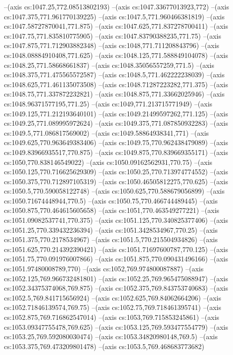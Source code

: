 --(axis cs:1047.25,772.08513802193)
--(axis cs:1047.33677013923,772)
--(axis cs:1047.375,771.961770139225)
--(axis cs:1047.5,771.960466381819)
--(axis cs:1047.58727870041,771.875)
--(axis cs:1047.625,771.837278700411)
--(axis cs:1047.75,771.835810775905)
--(axis cs:1047.83790388235,771.75)
--(axis cs:1047.875,771.712903882348)
--(axis cs:1048,771.711208843796)
--(axis cs:1048.08884910408,771.625)
--(axis cs:1048.125,771.588849104078)
--(axis cs:1048.25,771.58668661837)
--(axis cs:1048.35056557259,771.5)
--(axis cs:1048.375,771.475565572587)
--(axis cs:1048.5,771.462222238039)
--(axis cs:1048.625,771.461135073508)
--(axis cs:1048.71287223282,771.375)
--(axis cs:1048.75,771.337872232821)
--(axis cs:1048.875,771.33662025946)
--(axis cs:1048.96371577195,771.25)
--(axis cs:1049,771.213715771949)
--(axis cs:1049.125,771.212193640101)
--(axis cs:1049.21499597262,771.125)
--(axis cs:1049.25,771.089995972624)
--(axis cs:1049.375,771.087850932283)
--(axis cs:1049.5,771.086817569002)
--(axis cs:1049.58864938341,771)
--(axis cs:1049.625,770.963649383406)
--(axis cs:1049.75,770.962438479089)
--(axis cs:1049.83966935517,770.875)
--(axis cs:1049.875,770.839669355171)
--(axis cs:1050,770.838146549022)
--(axis cs:1050.09162562931,770.75)
--(axis cs:1050.125,770.716625629309)
--(axis cs:1050.25,770.713974774552)
--(axis cs:1050.375,770.712897105319)
--(axis cs:1050.46505812275,770.625)
--(axis cs:1050.5,770.590058122748)
--(axis cs:1050.625,770.588679056899)
--(axis cs:1050.71674448944,770.5)
--(axis cs:1050.75,770.466744489445)
--(axis cs:1050.875,770.464615605658)
--(axis cs:1051,770.463549277221)
--(axis cs:1051.09082537741,770.375)
--(axis cs:1051.125,770.340825377406)
--(axis cs:1051.25,770.339432236394)
--(axis cs:1051.3428534967,770.25)
--(axis cs:1051.375,770.2178534967)
--(axis cs:1051.5,770.215504934826)
--(axis cs:1051.625,770.214392390421)
--(axis cs:1051.71697600787,770.125)
--(axis cs:1051.75,770.091976007866)
--(axis cs:1051.875,770.090431496166)
--(axis cs:1051.97480008789,770)
--(axis cs:1052,769.974800087887)
--(axis cs:1052.125,769.966732481801)
--(axis cs:1052.25,769.965475088947)
--(axis cs:1052.34375374068,769.875)
--(axis cs:1052.375,769.843753740683)
--(axis cs:1052.5,769.841715656924)
--(axis cs:1052.625,769.84062664206)
--(axis cs:1052.71846139574,769.75)
--(axis cs:1052.75,769.718461395741)
--(axis cs:1052.875,769.716862547014)
--(axis cs:1053,769.715853245861)
--(axis cs:1053.09347755478,769.625)
--(axis cs:1053.125,769.593477554779)
--(axis cs:1053.25,769.592080030474)
--(axis cs:1053.34820980148,769.5)
--(axis cs:1053.375,769.473209801478)
--(axis cs:1053.5,769.468683773682)
